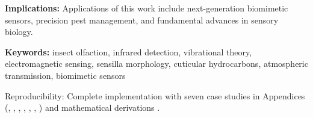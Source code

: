 \documentclass[
  13pt,
  a4paperpaper,
  12pt]{article}
\begin{document}
\textbf{Implications:} Applications of this work include next-generation
biomimetic sensors, precision pest management, and fundamental advances
in sensory biology.

\textbf{Keywords:} insect olfaction, infrared detection, vibrational
theory, electromagnetic sensing, sensilla morphology, cuticular
hydrocarbons, atmospheric transmission, biomimetic sensors

Reproducibility: Complete implementation with seven case studies in
Appendices (,
, ,
, ,
, ) and
mathematical derivations .
\end{document}
